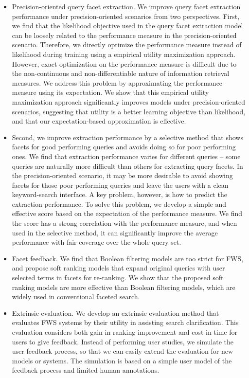 \begin{itemize}
\item Precision-oriented query facet extraction. We improve query facet extraction performance under precision-oriented scenarios from two perspectives. First, we find that the likelihood objective used in the query facet extraction model can be loosely related to the performance measure in the precision-oriented scenario. Therefore, we directly optimize the performance measure instead of likelihood during training using a empirical utility maximization approach. However, exact optimization on the performance measure is difficult due to the non-continuous and non-differentiable nature of information retrieval measures. We address this problem by approximating the performance measure using its expectation. We show that this empirical utility maximization approach significantly improves models under precision-oriented scenarios, suggesting that utility is a better learning objective than likelihood, and that our expectation-based approximation is effective.  


\item Second, we improve extraction performance by a selective method that shows facets for good performing queries and avoids doing so for poor performing ones. We find that extraction performance varies for different queries -- some queries are naturally more difficult than others for extracting query facets. In the precision-oriented scenario, it may be more desirable to avoid showing facets for those poor performing queries and leave the users with a clean keyword-search interface. A key problem, however, is how to predict the extraction performance. To solve this problem, we develop a simple and effective score based on the expectation of the performance measure. We find the score has a strong correlation with the performance measure, and when used in the selective method, it can significantly improve the average performance with fair coverage over the whole query set.

 
\item Facet feedback. We find that Boolean filtering models are too strict for FWS, and propose soft ranking models that expand original queries with user selected terms in facets for re-ranking. We show that the proposed soft ranking models are more effective than Boolean filtering models, which are widely used in conventional faceted search.
 
\item Extrinsic evaluation. We develop an extrinsic evaluation method that evaluates FWS systems by their utility in assisting search clarification. This evaluation considers both gain in ranking improvement and cost in time for users to give feedback. Instead of performing user studies, we simulate the user feedback process, so that we can easily extend the evaluation for new models or systems. The simulation is based on a simple user model of the feedback process and limited human annotations.


\end{itemize}
